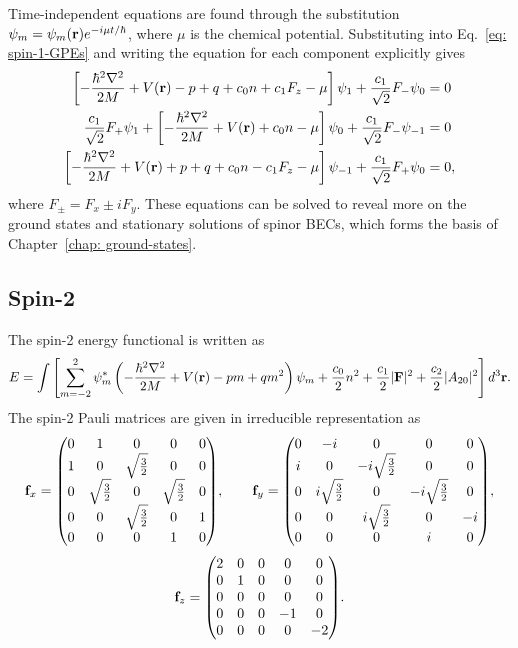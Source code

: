 Time-independent equations are found through the substitution
\(\psi_m = \psi_m(\vb{r})e^{-i\mu t/\hbar}\), where \(\mu \) is the chemical
potential.
Substituting into Eq.~\eqref{eq: spin-1-GPEs} and writing the equation for
each component explicitly gives
\begin{align}\label{eq: spin-1-GPEs-dimensional-psi1}
    \left[-\frac{\hbar^2\nabla^2}{2M} + V(\vb{r}) - p + q + c_0n + c_1F_z
    - \mu\right]\psi_1 + \frac{c_1}{\sqrt{2}}F_-\psi_0    & = 0  \\
    \frac{c_1}{\sqrt{2}}F_+\psi_1 + \left[-\frac{\hbar^2\nabla^2}{2M}
        + V(\vb{r}) + c_0n - \mu\right]\psi_0 + \frac{c_1}{\sqrt{2}}F_-\psi_{-1}
                                                          & = 0  \\
    \left[-\frac{\hbar^2\nabla^2}{2M} + V(\vb{r}) + p + q + c_0n - c_1F_z
    - \mu\right]\psi_{-1} + \frac{c_1}{\sqrt{2}}F_+\psi_0 & = 0,
    \label{eq: spin-1-GPEs-dimensional-psim1}
\end{align}
where \(F_{\pm} = F_x \pm iF_y\).
These equations can be solved to reveal more on the ground states and stationary
solutions of spinor BECs, which forms the basis of
Chapter~\ref{chap: ground-states}.

\subsection{Spin-2}
The spin-2 energy functional is written as~\cite{Kawaguchi2012}
\begin{equation}\label{eq: spin-2-energy-functional}
    E = \int \left[\sum_{m=-2}^{2}\psi_m^* \left(-\frac{\hbar^2\nabla^2}{2M}
    + V(\vb{r}) -pm + qm^2\right)\psi_m + \frac{c_0}{2}n^2
    + \frac{c_1}{2}|\vb{F}|^2 + \frac{c_2}{2}|A_{20}|^2\right] d^3\vb{r}.
\end{equation}
The spin-2 Pauli matrices are given in irreducible representation as
\begin{equation*}
    \vb{f}_x = \mqty(0 & 1  & 0 & 0 & 0 \\
    1 & 0 & \sqrt{\frac{3}{2}} & 0 & 0 \\
    0 & \sqrt{\frac{3}{2}} & 0 & \sqrt{\frac{3}{2}} & 0 \\
    0 & 0 & \sqrt{\frac{3}{2}} & 0 & 1 \\
    0 & 0 & 0 & 1 & 0), \qquad
    \vb{f}_y = \mqty(0 & -i  & 0 & 0 & 0 \\
    i & 0 & -i\sqrt{\frac{3}{2}} & 0 & 0 \\
    0 & i\sqrt{\frac{3}{2}} & 0 & -i\sqrt{\frac{3}{2}} & 0 \\
    0 & 0 & i\sqrt{\frac{3}{2}} & 0 & -i \\
    0 & 0 & 0 & i & 0),
\end{equation*}
\begin{equation}
    \vb{f}_z = \mqty(2 & 0 & 0 & 0 & 0 \\
    0 & 1 & 0 & 0 & 0 \\
    0 & 0 & 0 & 0 & 0 \\
    0 & 0 & 0 & -1 & 0 \\
    0 & 0 & 0 & 0 & -2).
\end{equation}

